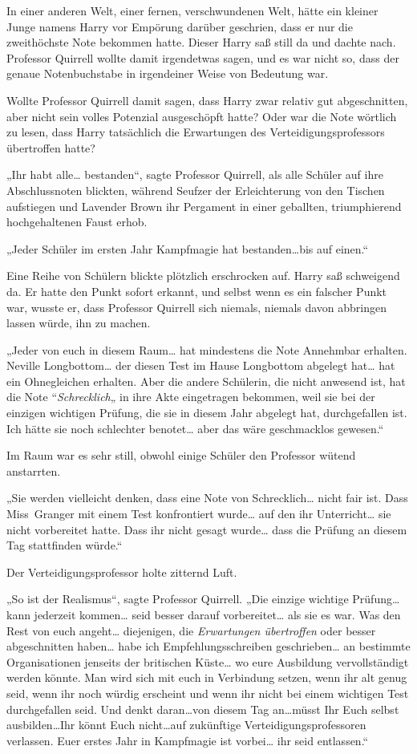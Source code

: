 {In einer anderen Welt, einer fernen, verschwundenen Welt, hätte ein kleiner Junge namens Harry vor Empörung darüber geschrien, dass er nur die zweithöchste Note bekommen hatte. Dieser Harry saß still da und dachte nach. Professor Quirrell wollte damit irgendetwas sagen, und es war nicht so, dass der genaue Notenbuchstabe in irgendeiner Weise von Bedeutung war.

Wollte Professor Quirrell damit sagen, dass Harry zwar relativ gut abgeschnitten, aber nicht sein volles Potenzial ausgeschöpft hatte? Oder war die Note wörtlich zu lesen, dass Harry tatsächlich die Erwartungen des Verteidigungsprofessors übertroffen hatte?

„Ihr habt alle… bestanden“, sagte Professor Quirrell, als alle Schüler auf ihre Abschlussnoten blickten, während Seufzer der Erleichterung von den Tischen aufstiegen und Lavender Brown ihr Pergament in einer geballten, triumphierend hochgehaltenen Faust erhob.

„Jeder Schüler im ersten Jahr Kampfmagie hat bestanden…bis auf einen.“

Eine Reihe von Schülern blickte plötzlich erschrocken auf. Harry saß schweigend da. Er hatte den Punkt sofort erkannt, und selbst wenn es ein falscher Punkt war, wusste er, dass Professor Quirrell sich niemals, niemals davon abbringen lassen würde, ihn zu machen.

„Jeder von euch in diesem Raum… hat mindestens die Note Annehmbar erhalten. Neville Longbottom… der diesen Test im Hause Longbottom abgelegt hat… hat ein Ohnegleichen erhalten. Aber die andere Schülerin, die nicht anwesend ist, hat die Note “\emph{Schrecklich}„ in ihre Akte eingetragen bekommen, weil sie bei der einzigen wichtigen Prüfung, die sie in diesem Jahr abgelegt hat, durchgefallen ist. Ich hätte sie noch schlechter benotet… aber das wäre geschmacklos gewesen.“

Im Raum war es sehr still, obwohl einige Schüler den Professor wütend anstarrten.

„Sie werden vielleicht denken, dass eine Note von Schrecklich… nicht fair ist. Dass Miss~Granger mit einem Test konfrontiert wurde… auf den ihr Unterricht… sie nicht vorbereitet hatte. Dass ihr nicht gesagt wurde… dass die Prüfung an diesem Tag stattfinden würde.“

Der Verteidigungsprofessor holte zitternd Luft.

„So ist der Realismus“, sagte Professor Quirrell. „Die einzige wichtige Prüfung… kann jederzeit kommen… seid besser darauf vorbereitet… als sie es war. Was den Rest von euch angeht… diejenigen, die \emph{Erwartungen übertroffen} oder besser abgeschnitten haben… habe ich Empfehlungsschreiben geschrieben… an bestimmte Organisationen jenseits der britischen Küste… wo eure Ausbildung vervollständigt werden könnte. Man wird sich mit euch in Verbindung setzen, wenn ihr alt genug seid, wenn ihr noch würdig erscheint und wenn ihr nicht bei einem wichtigen Test durchgefallen seid. Und denkt daran…von diesem Tag an…müsst Ihr Euch selbst ausbilden…Ihr könnt Euch nicht…auf zukünftige Verteidigungsprofessoren verlassen. Euer erstes Jahr in Kampfmagie ist vorbei… ihr seid entlassen.“

}
